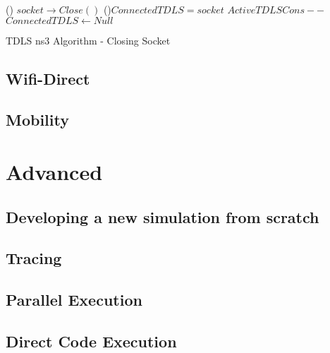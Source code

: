 \documentclass[a4paper]{book}
\begin{document}
\begin{algorithm}[H]
\SetAlgoLined

\Fn(){}{
	\nl $socket \rightarrow Close()$ \;
	\If(){$ConnectedTDLS = socket$}{
		\nl $ActiveTDLSCons--$ \;
		\nl $ConnectedTDLS \gets Null$ \;
	}
}

\caption{TDLS ns3 Algorithm - Closing Socket\label{tdlsAlgS}}
\end{algorithm}

\section{Wifi-Direct}

\section{Mobility}

\chapter{Advanced}

\section{Developing a new simulation from scratch}


\section{Tracing}


\section{Parallel Execution}


\section{Direct Code Execution}
\end{document}
